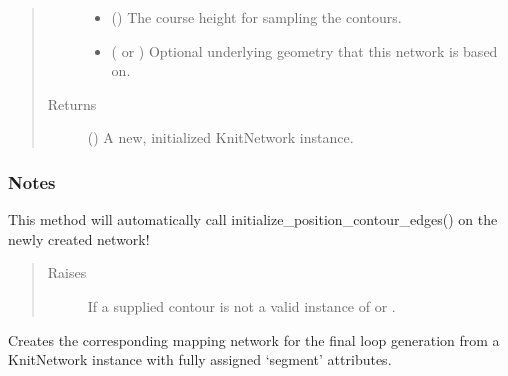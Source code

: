 \documentclass[letterpaper,10pt,english]{sphinxmanual}
\begin{document}
\begin{fulllineitems}
\begin{fulllineitems}
\begin{quote}
\begin{description}
\begin{itemize}
\item {} 
 () \textendash{} The course height for sampling the contours.

\item {} 
 ( or ) \textendash{} Optional underlying geometry that this network is based on.

\end{itemize}

\item[{Returns}] \leavevmode
{} () \textendash{} A new, initialized KnitNetwork instance.

\end{description}\end{quote}
\subsubsection*{Notes}

This method will automatically call initialize\_position\_contour\_edges() on
the newly created network!
\begin{quote}\begin{description}
\item[{Raises}] \leavevmode
{\hyperref[\detokenize{cockatoo:cockatoo.exception.KnitNetworkGeometryError}]{}} \textendash{} If a supplied contour is not a valid instance of
     or .

\end{description}\end{quote}

\end{fulllineitems}


\begin{fulllineitems}
\label{\detokenize{cockatoo:cockatoo.KnitNetwork.create_mapping_network}}
Creates the corresponding mapping network for the final loop generation
from a KnitNetwork instance with fully assigned ‘segment’ attributes.


\end{fulllineitems}
\end{fulllineitems}
\end{document}
